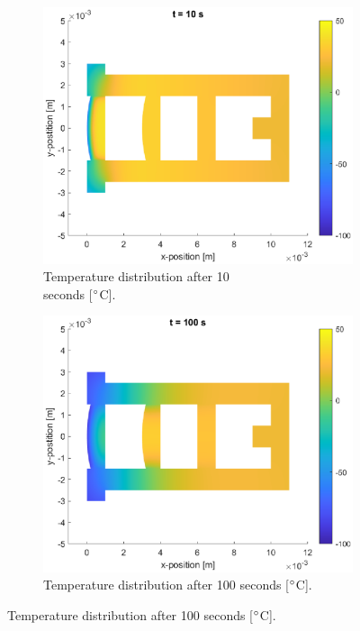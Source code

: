 \documentclass[a4paper,11pt]{article}
\begin{document}
\begin{figure}[H]
    \centering
    \begin{subfigure}{0.45\linewidth}{
        \centering
        \includegraphics[width=1\linewidth]{bDN1.eps}
        \caption{Temperature distribution after 10\\seconds [$\degree$C].}
        \label{sub:DN1}
    }\end{subfigure}
    \begin{subfigure}{0.45\linewidth}{
        \centering
        \includegraphics[width=1\linewidth]{bDN2.eps}
        \caption{Temperature distribution after 100 seconds [$\degree$C].}
        \label{sub:DN2}
    }\end{subfigure}

\end{figure}
\end{document}
